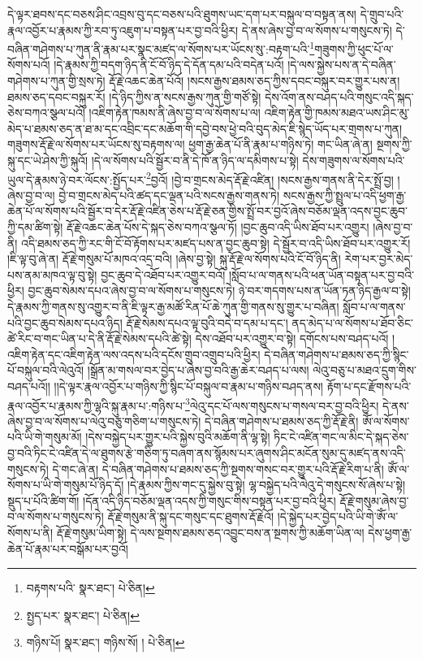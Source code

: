དེ་ལྟར་ཐབས་དང་བཅས་ཤིང་འབྲས་བུ་དང་བཅས་པའི་ཐུགས་ཡང་དག་པར་བསྐུལ་བ་བསྟན་ནས། དེ་གྲུབ་པའི་རྣལ་འབྱོར་པ་རྣམས་ཀྱི་རབ་ཏུ་འཇུག་པ་བསྟན་པར་བྱ་བའི་ཕྱིར། དེ་ནས་ཞེས་བྱ་བ་ལ་སོགས་པ་གསུངས་ཏེ། དེ་བཞིན་གཤེགས་པ་ཀུན་ནི་རྣམ་པར་སྣང་མཛད་ལ་སོགས་པར་ཡོངས་སུ་:བརྟག་པའི་\footnote{བརྟགས་པའི་  སྣར་ཐང་།  པེ་ཅིན། }གཟུགས་ཀྱི་ཕུང་པོ་ལ་སོགས་པའོ། །དེ་རྣམས་ཀྱི་བདག་ཉིད་ནི་ངོ་བོ་ཉིད་དེ་དོན་དམ་པའི་བདེན་པའོ། །དེ་ལས་སྐྱེས་པས་ན་དེ་བཞིན་གཤེགས་པ་ཀུན་གྱི་སྲས་ཏེ། རྡོ་རྗེ་འཆང་ཆེན་པོའོ། །སངས་རྒྱས་ཐམས་ཅད་ཀྱིས་དབང་བསྐུར་བར་གྱུར་པས་ན། ཐམས་ཅད་དབང་བསྐུར་རོ། །དེ་ཉིད་ཀྱིས་ན་སངས་རྒྱས་ཀུན་གྱི་གཙོ་སྟེ། དེས་འོག་ནས་བཤད་པའི་གསུང་འདི་སྐད་ཅེས་བཀའ་སྩལ་པའོ། །འཇིག་རྟེན་ཁམས་ནི་ཞེས་བྱ་བ་ལ་སོགས་པ་ལ། འཇིག་རྟེན་གྱི་ཁམས་མཐའ་ཡས་ཤིང་མུ་མེད་པ་ཐམས་ཅད་ན་ཐ་མ་དང་འབྲིང་དང་མཆོག་གི་དབྱེ་བས་ཕྱེ་བའི་བུད་མེད་ཇི་སྙེད་ཡོད་པར་གྲགས་པ་ཀུན། གཟུགས་རྡོ་རྗེ་ལ་སོགས་པར་ཡོངས་སུ་བརྟགས་ལ། ཕྱག་རྒྱ་ཆེན་པོ་ནི་རྣམ་པ་གཉིས་ཏེ། གང་ཡིན་ཞེ་ན། སྔགས་ཀྱི་སྐུ་དང་ཡེ་ཤེས་ཀྱི་སྐུའོ། །དེ་ལ་སོགས་པའི་སྦྱོར་བ་ནི་དེ་ཁོ་ན་ཉིད་ལ་དམིགས་པ་སྟེ། དེས་གཟུགས་ལ་སོགས་པའི་ཡུལ་དེ་རྣམས་ཉེ་བར་ལོངས་:སྤྱོད་པར་\footnote{སྤྱད་པར་  སྣར་ཐང་།  པེ་ཅིན། }བྱའོ། །བྱེ་བ་གྲངས་མེད་རྡོ་རྗེ་འཛིན། །སངས་རྒྱས་གནས་ནི་དེར་སྤྲོ་བྱ། །ཞེས་བྱ་བ་ལ། བྱེ་བ་གྲངས་མེད་པའི་ཚད་དང་ལྡན་པའི་སངས་རྒྱས་གནས་ཏེ། སངས་རྒྱས་ཀྱི་སྤྲུལ་པ་འདི་ཕྱག་རྒྱ་ཆེན་པོ་ལ་སོགས་པའི་སྦྱོར་བ་དེར་རྡོ་རྗེ་འཛིན་ཅེས་པ་རྡོ་རྗེ་ཅན་གྱིས་སྤྲོ་བར་བྱའོ་ཞེས་བཅོམ་ལྡན་འདས་བྱང་ཆུབ་ཀྱི་དམ་ཚིག་སྟེ། རྡོ་རྗེ་འཆང་ཆེན་པོས་དེ་སྐད་ཅེས་བཀའ་སྩལ་ཏོ། །བྱང་ཆུབ་འདི་ཡིས་ཐོབ་པར་འགྱུར། །ཞེས་བྱ་བ་ནི། འདི་ཐམས་ཅད་ཀྱི་རང་གི་ངོ་བོ་རྟོགས་པར་མཛད་པས་ན་བྱང་ཆུབ་སྟེ། དེ་སྦྱོར་བ་འདི་ཡིས་ཐོབ་པར་འགྱུར་རོ། །ཇི་ལྟ་བུ་ཞེ་ན། རྡོ་རྗེ་གསུམ་པོ་མཁའ་འདྲ་བའི། །ཞེས་བྱ་སྟེ། སྐུ་རྡོ་རྗེ་ལ་སོགས་པའི་ངོ་བོ་ཉིད་ནི། རེག་པར་བྱར་མེད་པས་ནམ་མཁའ་ལྟ་བུ་སྟེ། བྱང་ཆུབ་དེ་འཐོབ་པར་འགྱུར་བའོ། །སློབ་པ་ལ་གནས་པའི་ཕན་ཡོན་བསྟན་པར་བྱ་བའི་ཕྱིར། བྱང་ཆུབ་སེམས་དཔའ་ཞེས་བྱ་བ་ལ་སོགས་པ་གསུངས་ཏེ། ཉེ་བར་གདགས་པས་ན་ཡོན་ཏན་ཉིད་རྒྱལ་བ་སྟེ། དེ་རྣམས་ཀྱི་གནས་སུ་འགྱུར་བ་ནི་ཇི་ལྟར་རྒྱ་མཚོ་རིན་པོ་ཆེ་ཀུན་གྱི་གནས་སུ་གྱུར་པ་བཞིན། སློབ་པ་ལ་གནས་པའི་བྱང་ཆུབ་སེམས་དཔའ་ཉིད། རྡོ་རྗེ་སེམས་དཔའ་ལྟ་བུའི་བདེ་བ་དམ་པ་དང་། ནད་མེད་པ་ལ་སོགས་པ་ཐོབ་ཅིང་ཚེ་རིང་བ་གང་ཡིན་པ་དེ་ནི་རྡོ་རྗེ་སེམས་དཔའི་ཚེ་སྟེ། དེས་འཐོབ་པར་འགྱུར་བ་སྟེ། དགོངས་པས་བཤད་པའོ། །འཇིག་རྟེན་དང་འཇིག་རྟེན་ལས་འདས་པའི་དངོས་གྲུབ་འགྲུབ་པའི་ཕྱིར། དེ་བཞིན་གཤེགས་པ་ཐམས་ཅད་ཀྱི་སྙིང་པོ་བསྐུལ་བའི་ལེའུའོ། །སྒྲོན་མ་གསལ་བར་བྱེད་པ་ཞེས་བྱ་བའི་རྒྱ་ཆེར་བཤད་པ་ལས། ལེའུ་བཅུ་པ་མཐའ་དྲུག་གིས་བཤད་པའོ།། །།དེ་ལྟར་རྣལ་འབྱོར་པ་གཉིས་ཀྱི་སྙིང་པོ་བསྐུལ་བ་རྣམ་པ་གཉིས་བཤད་ནས། རྟོག་པ་དང་རྫོགས་པའི་རྣལ་འབྱོར་པ་རྣམས་ཀྱི་ལྷའི་སྐུ་རྣམ་པ་:གཉིས་པ་\footnote{གཉིས་པོ།   སྣར་ཐང་། གཉིས་སོ། །  པེ་ཅིན། }ལེའུ་དང་པོ་ལས་གསུངས་པ་གསལ་བར་བྱ་བའི་ཕྱིར། དེ་ནས་ཞེས་བྱ་བ་ལ་སོགས་པ་ལེའུ་བཅུ་གཅིག་པ་གསུངས་ཏེ། དེ་བཞིན་གཤེགས་པ་ཐམས་ཅད་ཀྱི་རྡོ་རྗེ་ནི། ཨོཾ་ལ་སོགས་པའི་ཡི་གེ་གསུམ་མོ། །དེས་བསྐྱེད་པར་གྱུར་པའི་སྐྱེས་བུའི་མཆོག་ནི་ལྷ་སྟེ། ཏིང་ངེ་འཛིན་གང་ལ་མིང་དེ་སྐད་ཅེས་བྱ་བའི་ཏིང་ངེ་འཛིན་དེ་ལ་ཐུགས་རྩེ་གཅིག་ཏུ་བཞག་ནས་སྙོམས་པར་ཞུགས་ཤིང་མངོན་སུམ་དུ་མཛད་ནས་འདི་གསུངས་ཏེ། དེ་གང་ཞེ་ན། དེ་བཞིན་གཤེགས་པ་ཐམས་ཅད་ཀྱི་སྔགས་གསང་བར་གྱུར་པའི་རྡོ་རྗེ་རིག་པ་ནི། ཨོཾ་ལ་སོགས་པ་ཡི་གེ་གསུམ་པོ་ཉིད་དོ། །དེ་རྣམས་ཀྱིས་གང་དུ་སྐྱེས་བུ་སྟེ། ལྷ་བསྐྱེད་པའི་ལེའུ་དེ་གསུངས་སོ་ཞེས་པ་སྟེ། སྡུད་པ་པོའི་ཚིག་གོ། །དོན་འདི་ཉིད་བཅོམ་ལྡན་འདས་ཀྱི་གསུང་གིས་བསྟན་པར་བྱ་བའི་ཕྱིར། རྡོ་རྗེ་གསུམ་ཞེས་བྱ་བ་ལ་སོགས་པ་གསུངས་ཏེ། རྡོ་རྗེ་གསུམ་ནི་སྐུ་དང་གསུང་དང་ཐུགས་རྡོ་རྗེའོ། །དེ་སྐྱེད་པར་བྱེད་པའི་ཡི་གེ་ཨོཾ་ལ་སོགས་པ་ནི། རྡོ་རྗེ་གསུམ་ཡིག་སྟེ། དེ་ལས་སྔགས་ཐམས་ཅད་འབྱུང་བས་ན་སྔགས་ཀྱི་མཆོག་ཡིན་ལ། དེས་ཕྱག་རྒྱ་ཆེན་པོ་རྣམ་པར་བསྒོམ་པར་བྱའོ། 